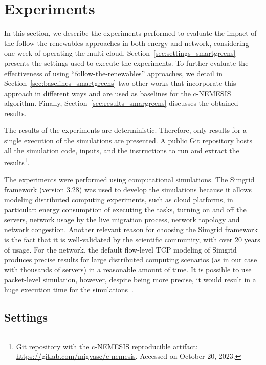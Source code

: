 \section{Experiments}

\label{sec:simulations_smargreens}

In this section, we describe the experiments performed to evaluate the impact of the follow-the-renewables approaches in both energy and network, considering one week of operating the multi-cloud. Section~\ref{sec:settings_smartgreens} presents the settings used to execute the experiments. To further evaluate the effectiveness of using ``follow-the-renewables'' approaches, we detail in Section~\ref{sec:baselines_smartgreens} two other works that incorporate this approach in different ways and are used as baselines for the c-NEMESIS algorithm. Finally, Section~\ref{sec:results_smargreens} discusses the obtained results. 
 
 The results of the experiments are deterministic. Therefore, only results for a single execution of the simulations are presented. A public Git repository hosts all the simulation code, inputs, and the instructions to run and extract the results\footnote{Git repository with the c-NEMESIS reproducible artifact: \url{https://gitlab.com/migvasc/c-nemesis}. Accessed on October 20, 2023.}. 


The experiments were performed using computational simulations. The Simgrid~\cite{CASANOVA20142899} framework (version 3.28) was used to develop the simulations because it allows modeling distributed computing experiments, such as cloud platforms, in particular: energy consumption of executing the tasks, turning on and off the servers, network usage by the live migration process, network topology and network congestion. Another relevant reason for choosing the Simgrid framework is the fact that it is well-validated by the scientific community, with over 20 years of usage. For the network, the default flow-level TCP modeling of Simgrid produces precise results for large distributed computing scenarios (as in our case with thousands of servers) in a reasonable amount of time. It is possible to use packet-level simulation, however, despite being more precise, it would result in a huge execution time for the simulations~\cite{velho2013simgridparameters}. 


\subsection{Settings}

